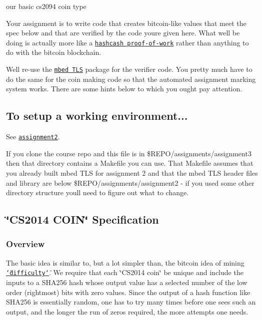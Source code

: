 our basic cs2094 coin type

Your assignment is to write code that creates bitcoin-\/like values that meet the spec below and that are verified by the code you\textquotesingle{}re given here. What we\textquotesingle{}ll be doing is actually more like a \href{https://www.bitcoinmining.com/what-is-hashcash/}{\tt hashcash proof-\/of-\/work} rather than anything to do with the bitcoin blockchain.

We\textquotesingle{}ll re-\/use the \href{https://tls.mbed.org/kb}{\tt mbed T\+LS} package for the verifier code. You pretty much have to do the same for the coin making code so that the automated assignment marking system works. There are some hints below to which you ought pay attention.

\subsection*{To setup a working environment...}

See \href{../assignment2/README.html}{\tt assignment2}.

If you clone the course repo and this file is in {\ttfamily \$\+R\+E\+PO/assignments/assignment3} then that directory contains a Makefile you can use. That Makefile assumes that you already built mbed T\+LS for assignment 2 and that the mbed T\+LS header files and library are below {\ttfamily \$\+R\+E\+PO/assignments/assignment2} -\/ if you used some other directory structure you\textquotesingle{}ll need to figure out what to change.

\subsection*{\char`\"{}\+C\+S2014 C\+O\+I\+N\char`\"{} Specification}

\subsubsection*{Overview}

The basic idea is similar to, but a lot simpler than, the bitcoin idea of mining \href{https://en.bitcoin.it/wiki/Difficulty}{\tt \char`\"{}difficulty\char`\"{}}. We require that each \char`\"{}\+C\+S2014 coin\char`\"{} be unique and include the inputs to a S\+H\+A256 hash whose output value has a selected number of the low order (rightmost) bits with zero values. Since the output of a hash function like S\+H\+A256 is essentially random, one has to try many times before one sees such an output, and the longer the run of zeros required, the more attempts one needs.

